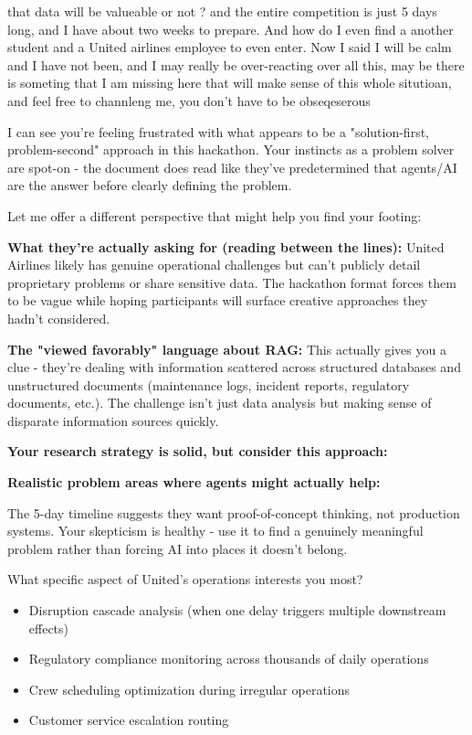 \begin{userprompt}
that data will be valueable or not ? and the entire competition is just 5 days long, and I have about two weeks to prepare. And how do I even find a another student and a United airlines employee to even enter. Now I said I will be calm and I have not been, and I may really be over-reacting over all this, may be there is someting that I am missing here that will make sense of this whole situtioan, and feel free to channleng me, you don't have to be obseqeserous
\end{userprompt}

\begin{botresponse}
I can see you're feeling frustrated with what appears to be a "solution-first, problem-second" approach in this hackathon. Your instincts as a problem solver are spot-on - the document does read like they've predetermined that agents/AI are the answer before clearly defining the problem.

Let me offer a different perspective that might help you find your footing:

\textbf{What they're actually asking for (reading between the lines):} United Airlines likely has genuine operational challenges but can't publicly detail proprietary problems or share sensitive data. The hackathon format forces them to be vague while hoping participants will surface creative approaches they hadn't considered.

\textbf{The "viewed favorably" language about RAG:} This actually gives you a clue - they're dealing with information scattered across structured databases and unstructured documents (maintenance logs, incident reports, regulatory documents, etc.). The challenge isn't just data analysis but making sense of disparate information sources quickly.

\textbf{Your research strategy is solid, but consider this approach:}

\textbf{Realistic problem areas where agents might actually help:}

The 5-day timeline suggests they want proof-of-concept thinking, not production systems. Your skepticism is healthy - use it to find a genuinely meaningful problem rather than forcing AI into places it doesn't belong.

What specific aspect of United's operations interests you most?

\begin{itemize}
\item Disruption cascade analysis (when one delay triggers multiple downstream effects)
\item Regulatory compliance monitoring across thousands of daily operations
\item Crew scheduling optimization during irregular operations
\item Customer service escalation routing
\end{itemize}


\end{botresponse}
